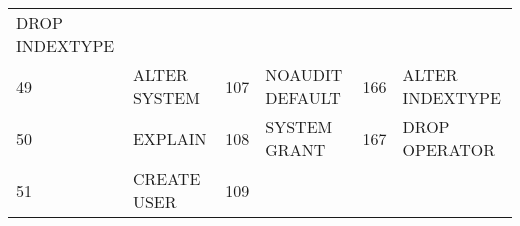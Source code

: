 \begin{longtable}[]{@{}llllll@{}}
\begin{minipage}[t]{0.24\columnwidth}
DROP INDEXTYPE\strut
\end{minipage}\tabularnewline
\begin{minipage}[t]{0.06\columnwidth}\raggedright\strut
49\strut
\end{minipage} & \begin{minipage}[t]{0.19\columnwidth}\raggedright\strut
ALTER SYSTEM\strut
\end{minipage} & \begin{minipage}[t]{0.06\columnwidth}\raggedright\strut
107\strut
\end{minipage} & \begin{minipage}[t]{0.24\columnwidth}\raggedright\strut
NOAUDIT DEFAULT\strut
\end{minipage} & \begin{minipage}[t]{0.06\columnwidth}\raggedright\strut
166\strut
\end{minipage} & \begin{minipage}[t]{0.24\columnwidth}\raggedright\strut
ALTER INDEXTYPE\strut
\end{minipage}\tabularnewline
\begin{minipage}[t]{0.06\columnwidth}\raggedright\strut
50\strut
\end{minipage} & \begin{minipage}[t]{0.19\columnwidth}\raggedright\strut
EXPLAIN\strut
\end{minipage} & \begin{minipage}[t]{0.06\columnwidth}\raggedright\strut
108\strut
\end{minipage} & \begin{minipage}[t]{0.24\columnwidth}\raggedright\strut
SYSTEM GRANT\strut
\end{minipage} & \begin{minipage}[t]{0.06\columnwidth}\raggedright\strut
167\strut
\end{minipage} & \begin{minipage}[t]{0.24\columnwidth}\raggedright\strut
DROP OPERATOR\strut
\end{minipage}\tabularnewline
\begin{minipage}[t]{0.06\columnwidth}\raggedright\strut
51\strut
\end{minipage} & \begin{minipage}[t]{0.19\columnwidth}\raggedright\strut
CREATE USER\strut
\end{minipage} & \begin{minipage}[t]{0.06\columnwidth}\raggedright\strut
109\strut
\end{minipage} & \begin{minipage}[t]{0.24\columnwidth}\raggedright\strut

\end{minipage}
\end{longtable}
